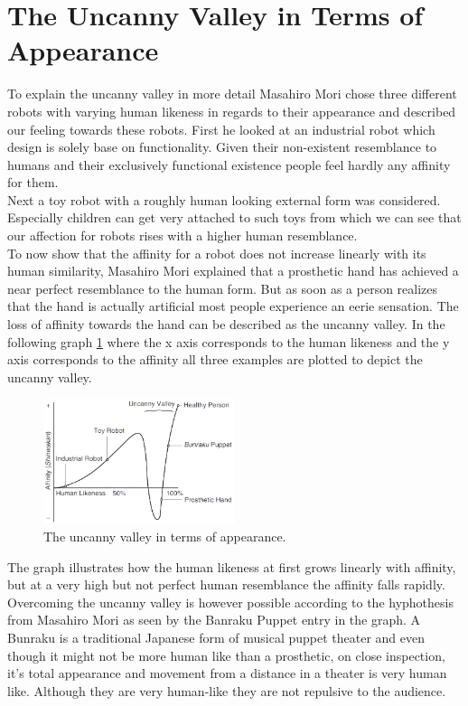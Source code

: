 \section{The Uncanny Valley in Terms of Appearance}
To explain the uncanny valley in more detail Masahiro Mori chose three different robots with varying human likeness in regards to their appearance and described our feeling towards these robots. First he looked at an industrial robot which design is solely base on functionality. Given their non-existent resemblance to humans and their exclusively functional existence people feel hardly any affinity for them.\\
Next a toy robot with a roughly human looking external form was considered. Especially children can get very attached to such toys from which we can see that our affection for robots rises with a higher human resemblance.\\
To now show that the affinity for a robot does not increase linearly with its human similarity, Masahiro Mori explained that a prosthetic hand has achieved a near perfect resemblance to the human form. But as soon as a person realizes that the hand is actually artificial most people experience an eerie sensation. The loss of affinity towards the hand can be described as the uncanny valley.
In the following graph \ref{fig:uv_appearance} where the x axis corresponds to the human likeness and the y axis corresponds to the affinity all three examples are plotted to depict the uncanny valley. 
\begin{figure} %
    \centering
    \includegraphics[width=0.5\textwidth]{graphics/uv_appearance.png}
    \caption{The uncanny valley in terms of appearance.}
    \label{fig:uv_appearance}
\end{figure}
The graph illustrates how the human likeness at first grows linearly with affinity, but at a very high but not perfect human resemblance the affinity falls rapidly.\\ Overcoming the uncanny valley is however possible according to the hyphothesis from Masahiro Mori as seen by the Banraku Puppet entry in the graph. A Bunraku is a traditional Japanese form of musical puppet theater and even though it might not be more human like than a prosthetic, on close inspection, it's total appearance and movement from a distance in a theater is very human like. Although they are very human-like they are not repulsive to the audience. \cite{original_masahiro}

